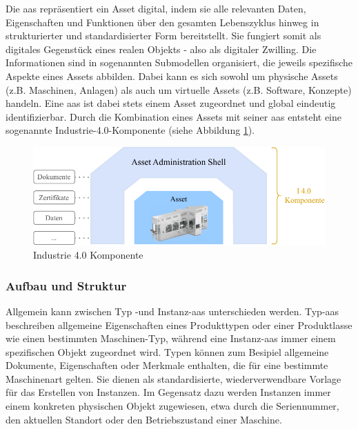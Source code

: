 Die \acs{aas} repräsentiert ein Asset digital, indem sie alle relevanten Daten, Eigenschaften und Funktionen über den gesamten Lebenszyklus hinweg in strukturierter und standardisierter Form bereitstellt. 
Sie fungiert somit als digitales Gegenstück eines realen Objekts - also als digitaler Zwilling.
Die Informationen sind in sogenannten Submodellen organisiert, die jeweils spezifische Aspekte eines Assets abbilden.
Dabei kann es sich sowohl um physische Assets (z.B. Maschinen, Anlagen) als auch um virtuelle Assets (z.B. Software, Konzepte) handeln. 
Eine \acs{aas} ist dabei stets einem Asset zugeordnet und global eindeutig identifizierbar. 
Durch die Kombination eines Assets mit seiner \acs{aas} entsteht eine sogenannte Industrie-4.0-Komponente (siehe Abbildung \ref{fig:Industrie4Komponente}).

\vspace{1em}
\begin{figure}[htbp]
    \centering
    \includegraphics[width=1\textwidth]{Bilder/I4Komponente/I4KomponenteNeu.pdf}
    \caption{Industrie 4.0 Komponente}
    \label{fig:Industrie4Komponente}
\end{figure}

\subsubsection{Aufbau und Struktur}
Allgemein kann zwischen Typ -und Instanz-\acs{aas} unterschieden werden.
Typ-\acs{aas} beschreiben allgemeine Eigenschaften eines Produkttypen oder einer Produktlasse wie einen bestimmten Maschinen-Typ, während eine Instanz-\acs{aas} immer einem spezifischen Objekt zugeordnet wird.
Typen können zum Besipiel allgemeine Dokumente, Eigenschaften oder Merkmale enthalten, die für eine bestimmte Maschinenart gelten.
Sie dienen als standardisierte, wiederverwendbare Vorlage für das Erstellen von Instanzen.
Im Gegensatz dazu werden Instanzen immer einem konkreten physischen Objekt zugewiesen, etwa durch die Seriennummer, den aktuellen Standort oder den Betriebszustand einer Maschine.


